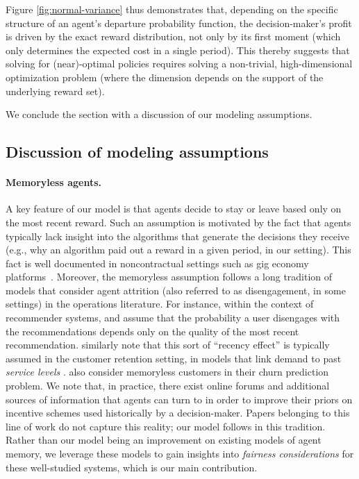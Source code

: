\documentclass[12pt]{article}
\begin{document}
Figure \ref{fig:normal-variance} thus demonstrates that, depending on the specific structure of an agent's departure probability function, the decision-maker's profit is driven by the exact reward distribution, not only by its first moment (which only determines the expected cost in a single period). This thereby suggests that solving for (near)-optimal policies requires solving a non-trivial, high-dimensional optimization problem (where the dimension depends on the support of the underlying reward set).


We conclude the section with a discussion of our modeling assumptions.

\subsection{Discussion of modeling assumptions}\label{ssec:modeling-asp} 

\paragraph{{Memoryless agents.}} A key feature of our model is that agents decide to stay or leave based only on the most recent reward. {Such an assumption} is motivated by the fact that {agents typically lack insight into the algorithms that generate the decisions they receive (e.g., why an algorithm paid out a reward in a given period, in our setting). This fact is well documented in noncontractual settings such as gig economy platforms~\cite{no_transparency}.} 
{Moreover, the memoryless assumption follows a long tradition of models that consider agent attrition (also referred to as disengagement, in some settings) in the operations literature. For instance, within the context of recommender systems, \cite{ben2022modeling} and \cite{bastani2021learning} assume that the probability a user disengages with the recommendations depends only on the quality of the most recent recommendation. \cite{afeche2017customer} similarly note that this sort of  ``recency effect'' is typically assumed in the customer retention setting, in models that link demand to past {\it service levels} \cite{hall2000customer, ho2006incorporating, liu2007dynamic}. \cite{lemmens2020managing} also consider memoryless customers in their churn prediction problem. {We note that, in practice, there exist online forums and additional sources of information that agents can turn to in order to improve their priors on incentive schemes used historically by a decision-maker. Papers belonging to this line of work do not capture this reality; our model follows in this tradition. Rather} than our model being an improvement on existing models of agent memory, we leverage these models to gain insights into {\it fairness considerations} for these well-studied systems, which is our main contribution.}
\end{document}
